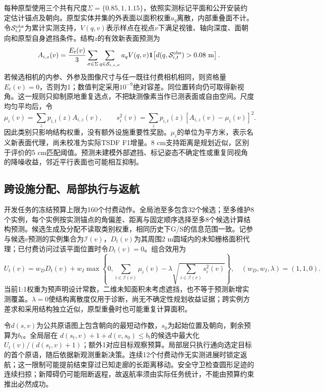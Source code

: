 每种原型使用三个共有尺度$\Sigma=\{0.85,1,1.15\}$，依照实测标记平面和公开安装约定估计锚点及朝向。原型实体并集的外表面以面积权重$a_q$离散，内部重叠面不计。令$\mathcal S_{i,t}^{\rm obs}$为累计实测支持，$V(q,v)$表示样点在视点$v$下满足视锥、轴向深度、面朝向和原型自身遮挡条件。结构$z$的有效新表面预测为
\begin{equation}
 A_{i,z}(v)=\frac{E_t(v)}{3}\sum_{\sigma\in\Sigma}
 \sum_{q\in\mathcal S_{i,z,\sigma}}a_qV(q,v)
 \mathbf 1\!\left[d(q,\mathcal S_{i,t}^{\rm obs})>0.08\ \mathrm m\right].
 \label{eq:extension-area}
\end{equation}
若候选相机的内参、外参及图像尺寸与任一既往付费相机相同，则资格量$E_t(v)=0$，否则为1；数值判定采用$10^{-9}$绝对容差。同位置转向仍可取得新视角。这一规则只抑制原地重复选点，不把缺测像素当作已测表面或自由空间。尺度均匀平均后，令
\begin{equation}
 \mu_i(v)=\sum_zp_{i,t}(z)A_{i,z}(v),\qquad
 s_i^2(v)=\sum_zp_{i,t}(z)[A_{i,z}(v)-\mu_i(v)]^2.
 \label{eq:extension-moments}
\end{equation}
因此类别只影响结构权重，没有额外设施重要性奖励。$\mu_i$的单位为平方米，表示名义新表面代理，尚未校准为实际TSDF F1增量。8 cm支持距离是规划近似，区别于评价的5 cm匹配阈值。预测未建模外部遮挡、标记姿态不确定性或重复同视角的降噪收益，邻近平行表面也可能相互抑制。

\subsection{跨设施分配、局部执行与返航}
开发任务的冻结预算上限为160个付费动作。全局池至多包含32个候选；至多维护8个实例，每个实例按实测锚点的角偏差、距离与固定顺序选择至多8个候选计算结构预测。候选生成及分配不读取类别权重，相同历史下G/S的信息范围一致。记参与候选$v$预测的实例集合为$\mathcal I(v)$，$D_t(v)$为其周围2 m圆域内的未知栅格面积代理；已付费访问过该平面位置时令$D_t(v)=0$。组合效用为
\begin{equation}
 U_t(v)=w_DD_t(v)+w_I\max\!\left\{0,
 \sum_{i\in\mathcal I(v)}\mu_i(v)
 -\lambda\sqrt{\sum_{i\in\mathcal I(v)}s_i^2(v)}\right\},
 \quad(w_D,w_I,\lambda)=(1,1,0).
 \label{eq:extension-utility}
\end{equation}
当前1:1权重为预声明设计常数，二维未知面积未考虑遮挡，也不等于预测新增实测覆盖。$\lambda=0$使结构离散度仅用于诊断，尚无不确定性规划收益证据；跨实例方差求和采用结构独立近似，原型重叠时也可能重复计算面积。

令$d(s,v)$为公共原语图上包含朝向的最短动作数，$s_0$为起始位置及朝向，剩余预算为$b_t$。全局层在
$d(s_t,v)+1+d(v,s_0)\le b_t$的候选中最大化$U_t(v)/(d(s_t,v)+1)$；额外1对应目标观察预算。局部层只执行通向选定目标的首个原语，随后依据新观测重新决策。连续12个付费动作无实测进展时锁定返航；这一限制可能提前结束穿过已知走廊的长距离移动。安全守卫检查圆形足迹的连续扫掠；新障碍仍可能阻断返程，故返航率须由实际任务统计，不能由预算约束推出必然成功。

